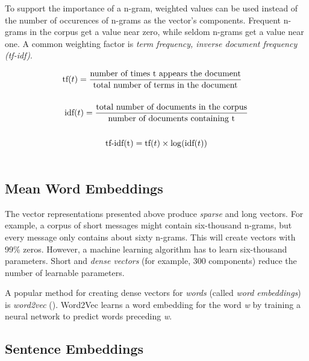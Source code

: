 To support the importance of a n-gram, weighted values can be used instead of the number of occurences of n-grams as the vector's components. Frequent n-grams in the corpus get a value near zero, while seldom n-grams get a value near one. A common weighting factor is \emph{term frequency, inverse document frequency (tf-idf)}.

\begin{equation*}
\begin{multlined}
\text{tf}(t) = \frac{\text{number of times t appears the document}}{\text{total number of terms in the document}} \\
\hfill\\
\text{idf}(t) = \frac{\text{total number of documents in the corpus}}{\text{number of documents containing t}} \\
\hfill\\
\text{tf-idf(t)} = \text{tf}(t) \times \log (\text{idf}(t)) \\
\end{multlined}
\end{equation*}



\subsection{Mean Word Embeddings}
The vector representations presented above produce \emph{sparse} and long vectors. For example, a corpus of short messages might contain six-thousand n-grams, but every message only contains about sixty n-grams. This will create vectors with 99\% zeros. However, a machine learning algorithm has to learn six-thousand parameters. Short and \emph{dense vectors} (for example, 300 components) reduce the number of learnable parameters.

A popular method for creating dense vectors for \emph{words} (called \emph{word embeddings}) is \emph{word2vec} (\cite{NIPS2013_5021}). Word2Vec learns a word embedding for the word \emph{w} by training a neural network to predict words preceding \emph{w}.


\subsection{Sentence Embeddings}